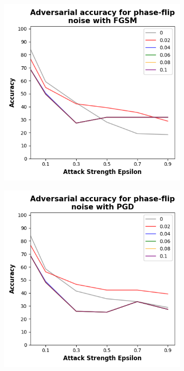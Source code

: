 \begin{figure}[!h]
  \centering

  \begin{subfigure}{0.45\textwidth}
      \includegraphics[width=\linewidth]{figures/evaluation_results/breast-cancer/pqc/figures/phase-flip-fgsm.png}
      \label{fig:bc15}
  \end{subfigure} \qquad
  \begin{subfigure}{0.45\textwidth}
      \includegraphics[width=\linewidth]{figures/evaluation_results/breast-cancer/pqc/figures/phase-flip-pgd.png}
      \label{fig:bc16}
  \end{subfigure}


\end{figure}
